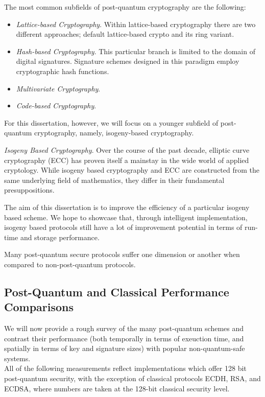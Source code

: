 The most common subfields of post-quantum cryptography are the following:
\begin{itemize}
\item \textit{Lattice-based Cryptography}. Within lattice-based cryptography there are two different approaches; default lattice-based crypto and its ring variant.
\item \textit{Hash-based Cryptography}. This particular branch is limited to the domain of digital signatures. Signature schemes designed in this paradigm employ cryptographic hash functions.
\item \textit{Multivariate Cryptography}.
\item \textit{Code-based Cryptography}.
\end{itemize}
For this dissertation, however, we will focus on a younger subfield of post-quantum cryptography, namely, isogeny-based cryptography. 

\noindent
\textit{Isogeny Based Cryptography}. Over the course of the past decade, elliptic curve cryptography (ECC) has proven itself a mainstay in the wide world of applied cryptology. While isogeny based cryptography and ECC are constructed from the same underlying field of mathematics, they differ in their fundamental presuppositions.

The aim of this dissertation is to improve the efficiency of a particular isogeny based scheme. We hope to showcase that, through intelligent implementation, isogeny based protocols still have a lot of improvement potential in terms of run-time and storage performance. 

Many post-quantum secure protocols suffer one dimension or another when compared to non-post-quantum protocols.

\subsection{Post-Quantum and Classical Performance Comparisons}

We will now provide a rough survey of the many post-quantum schemes and contrast their performance (both temporally in terms of exeuction time, and spatially in terms of key and signature sizes) with popular non-quantum-safe systems.\\

All of the following measurements reflect implementations which offer 128 bit post-quantum security, with the exception of classical protocols ECDH, RSA, and ECDSA, where numbers are taken at the 128-bit classical security level.

